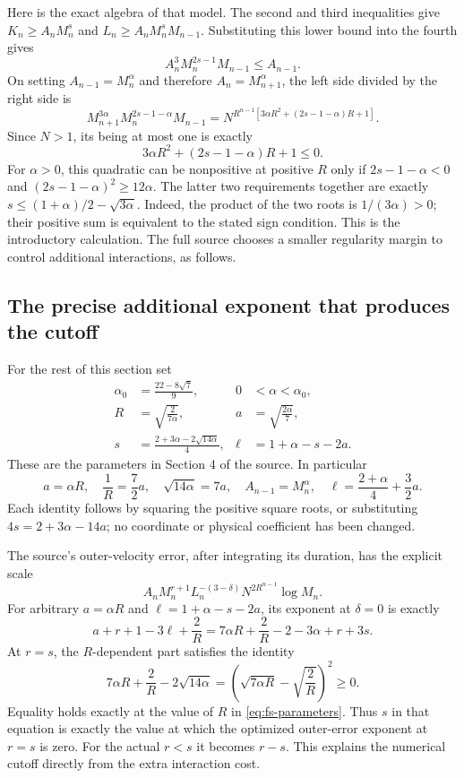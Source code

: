Here is the exact algebra of that model. The second and third inequalities give
$K_n\geq A_nM_n^s$ and $L_n\geq A_nM_n^sM_{n-1}$. Substituting this lower
bound into the fourth gives
\[
 A_n^3M_n^{2s-1}M_{n-1}\leq A_{n-1}.
\]
On setting $A_{n-1}=M_n^\alpha$ and therefore
$A_n=M_{n+1}^\alpha$, the left side divided by the right side is
\[
 M_{n+1}^{3\alpha}M_n^{2s-1-\alpha}M_{n-1}
 =N^{R^{n-1}[3\alpha R^2+(2s-1-\alpha)R+1]}.
\]
Since $N>1$, its being at most one is exactly
\[
 3\alpha R^2+(2s-1-\alpha)R+1\leq0.                 \tag{FS2}
\]
For $\alpha>0$, this quadratic can be nonpositive at positive $R$ only if
$2s-1-\alpha<0$ and $(2s-1-\alpha)^2\geq12\alpha$.
The latter two requirements together are exactly
$s\leq(1+\alpha)/2-\sqrt{3\alpha}$. Indeed, the product of the two roots is
$1/(3\alpha)>0$; their positive sum is equivalent to the stated sign condition.
This is the introductory calculation. The full source chooses a smaller
regularity margin to control additional interactions, as follows.

\subsection{The precise additional exponent that produces the cutoff}

For the rest of this section set
\begin{align}
 \alpha_0&=\frac{22-8\sqrt7}{9},&0&<\alpha<\alpha_0,\nonumber\\
 R&=\sqrt{\frac{2}{7\alpha}},&
 a&=\sqrt{\frac{2\alpha}{7}},\nonumber\\
 s&=\frac{2+3\alpha-2\sqrt{14\alpha}}4,&
 \ell&=1+\alpha-s-2a.                              \label{eq:fs-parameters}
\end{align}
These are the parameters in Section 4 of the source. In particular
\[
 a=\alpha R,\quad \frac1R=\frac72a,\quad
 \sqrt{14\alpha}=7a,\quad
 A_{n-1}=M_n^\alpha,\quad
 \ell=\frac{2+\alpha}{4}+\frac32a.                \tag{FS3}\label{eq:fs-id}
\]
Each identity follows by squaring the positive square roots, or substituting
$4s=2+3\alpha-14a$; no coordinate or physical coefficient has been changed.

The source's outer-velocity error, after integrating its duration, has the
explicit scale
\[
 A_nM_n^{r+1}L_n^{-(3-\delta)}N^{2R^{n-1}}\log M_n.
                                                        \tag{FS4}\label{eq:fs-outer}
\]
For arbitrary $a=\alpha R$ and $\ell=1+\alpha-s-2a$, its exponent at
$\delta=0$ is exactly
\[
 a+r+1-3\ell+\frac2R
 =7\alpha R+\frac2R-2-3\alpha+r+3s.
\]
At $r=s$, the $R$-dependent part satisfies the identity
\[
 7\alpha R+\frac2R-2\sqrt{14\alpha}
 =\left(\sqrt{7\alpha R}-\sqrt{\frac2R}\right)^2\geq0.
\]
Equality holds exactly at the value of $R$ in \eqref{eq:fs-parameters}.
Thus $s$ in that equation is exactly the value at which the optimized
outer-error exponent at $r=s$ is zero. For the actual $r<s$ it becomes $r-s$.
This explains the numerical cutoff directly from the extra interaction cost.

